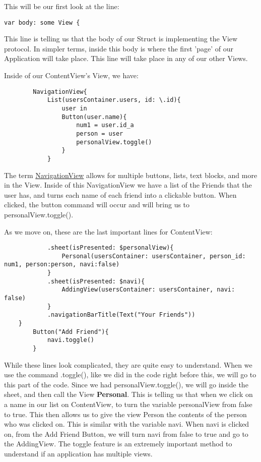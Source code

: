 \documentclass{article}
\theoremstyle{theorem}
\theoremstyle{definition}
\theoremstyle{remark}
\begin{document}
\noindent\newline This will be our first look at the line:
\begin{verbatim}
var body: some View {
\end{verbatim}
\noindent\newline This line is telling us that the body of our Struct is implementing the View protocol. In simpler terms, inside this body is where the first 'page' of our Application will take place. This line will take place in any of our other Views.

\noindent\newline Inside of our ContentView's View, we have:
\begin{verbatim}
        NavigationView{
            List(usersContainer.users, id: \.id){
                user in
                Button(user.name){
                    num1 = user.id_a
                    person = user
                    personalView.toggle()
                }
            }
\end{verbatim}
\noindent\newline The term \href{https://bignerdranch.com/blog/the-different-forms-of-navigation-in-swiftui/}{NavigationView} allows for multiple buttons, lists, text blocks, and more in the View. Inside of this NavigationView we have a list of the Friends that the user has, and turns each name of each friend into a clickable button. When clicked, the button command will occur and will bring us to personalView.toggle().

\noindent\newline As we move on, these are the last important lines for ContentView:
\begin{verbatim}
            .sheet(isPresented: $personalView){
                Personal(usersContainer: usersContainer, person_id: num1, person:person, navi:false)
            }
            .sheet(isPresented: $navi){
                AddingView(usersContainer: usersContainer, navi: false)
            }
            .navigationBarTitle(Text("Your Friends"))
    }
        Button("Add Friend"){
            navi.toggle()
        }
\end{verbatim}   
\noindent\newline While these lines look complicated, they are quite easy to understand. When we use the command .toggle(), like we did in the code right before this, we will go to this part of the code. Since we had personalView.toggle(), we will go inside the sheet, and then call the View \textbf{Personal}. This is telling us that when we click on a name in our list on ContentView, to turn the variable personalView from false to true. This then allows us to give the view Person the contents of the person who was clicked on. This is similar with the variable navi. When navi is clicked on, from the Add Friend Button, we will turn navi from false to true and go to the AddingView. The toggle feature is an extremely important method to understand if an application has multiple views.
\end{document}

